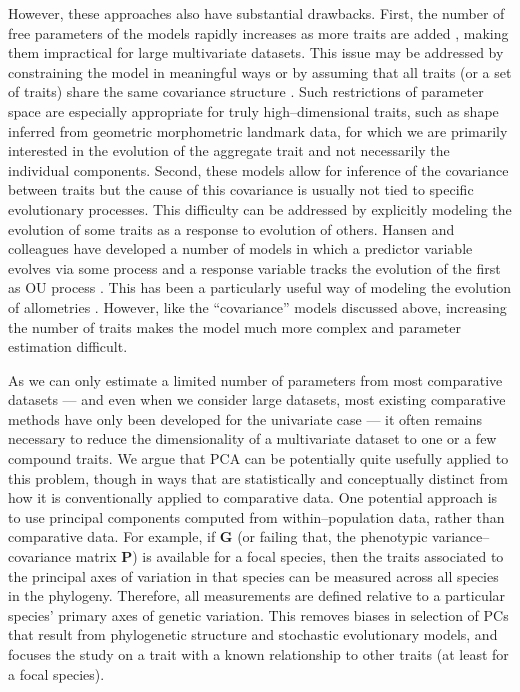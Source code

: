 \documentclass[a4paper,12pt]{article}
\begin{document}
However, these approaches also have substantial drawbacks. First, the number of free parameters of the models rapidly increases as more traits are added \citep{RevellHarmon2008}, making them impractical for large multivariate datasets. This issue may be addressed by constraining the model in meaningful ways \citep{ButlerKing2004} or by assuming that all traits (or a set of traits) share the same covariance structure \citep{Klingenberg2013, Adams2014}. Such restrictions of parameter space are especially appropriate for truly high--dimensional traits, such as shape inferred from geometric morphometric landmark data, for which we are primarily interested in the evolution of the aggregate trait and not necessarily the individual components. Second, these models allow for inference of the covariance between traits but the cause of this covariance is usually not tied to specific evolutionary processes. This difficulty can be addressed by explicitly modeling the evolution of some traits as a response to evolution of others. Hansen and colleagues have developed a number of models in which a predictor variable evolves via some process and a response variable tracks the evolution of the first as OU process \citep{Hansen2008, Hansen2012SysBio, Bartoszek2012}. This has been a particularly useful way of modeling the evolution of allometries \citep{Hansen2012SysBio, Voje2013}. However, like the ``covariance''  models discussed above, increasing the number of traits makes the model much more complex and parameter estimation difficult.

As we can only estimate a limited number of parameters from most comparative datasets --- and even when we consider large datasets, most existing comparative methods have only been developed for the univariate case --- it often remains necessary to reduce the dimensionality of a multivariate dataset to one or a few compound traits. We argue that PCA can be potentially quite usefully applied to this problem, though in ways that are statistically and conceptually distinct from how it is conventionally applied to comparative data. One potential approach is to use principal components computed from within--population data, rather than comparative data. For example, if $\mathbf{G}$ (or failing that, the phenotypic variance--covariance matrix $\mathbf{P}$) is available for a focal species, then the traits associated to the principal axes of variation in that species can be measured across all species in the phylogeny. Therefore, all measurements are defined relative to a particular species' primary axes of genetic variation. This removes biases in selection of PCs that result from phylogenetic structure and stochastic evolutionary models, and focuses the study on a trait with a known relationship to other traits (at least for a focal species). 
\end{document}
